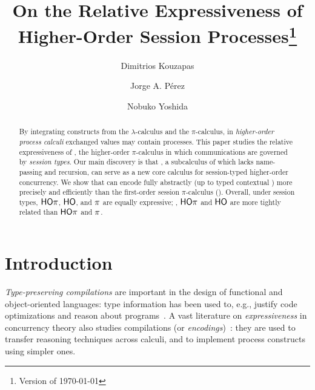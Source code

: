 \documentclass[runningheads]{llncs}
\begin{document}
\title{On the Relative Expressiveness of
Higher-Order Session Processes\thanks{Version of \today}
}

\author{
	Dimitrios Kouzapas
	\and
	Jorge A. P\'{e}rez
	\and Nobuko Yoshida
}
\maketitle




\pagestyle{plain}

%

\begin{abstract}
By integrating
constructs from the $\lambda$-calculus and 
the $\pi$-calculus,
in \emph{higher-order process calculi} exchanged values may contain processes.
This paper studies the relative expressiveness of \HOp, 
the higher-order $\pi$-calculus in
which communications are governed by \emph{session types}. 
Our main discovery is that \HO, a subcalculus of \HOp which lacks name-passing and recursion, 
can serve as a new core calculus for session-typed higher-order
concurrency. %
We show that
 \HO can encode \HOp fully abstractly 
(up to typed contextual )
more precisely and efficiently than the first-order 
session $\pi$-calculus (\sessp).
Overall, under session types, 
$\mathsf{HO}\pi$, $\mathsf{HO}$, and $\pi$ 
are equally expressive; ,  
$\mathsf{HO}\pi$ and $\mathsf{HO}$ are more tightly related than 
$\mathsf{HO}\pi$ and $\pi$.
\end{abstract}


\section{Introduction}
\label{sec:intro}
%


\emph{Type-preserving compilations} are important in the design of
functional and object-oriented languages: type information has been
used to, e.g., justify code optimizations and reason about programs~\cite{DBLP:journals/toplas/MorrisettWCG99,DBLP:conf/pldi/ShaoA95,DBLP:journals/toplas/LeagueST02}.
A vast literature on 
{\em expressiveness} 
in concurrency theory
also studies compilations (or \emph{encodings})~\cite{Palamidessi03,DBLP:journals/iandc/Gorla10,DBLP:journals/tcs/FuL10,DBLP:conf/icalp/LanesePSS10,DBLP:journals/corr/PetersG15}:
they are used to transfer reasoning techniques 
across calculi,
and to 
implement process constructs using simpler ones.
\end{document}
